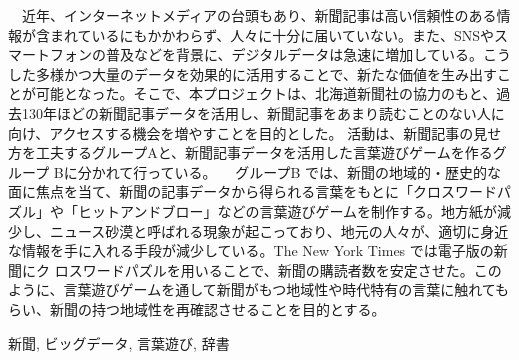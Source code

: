 \documentclass[openany, 11pt,papersize,dvipdfm]{jsbook}
\begin{document}
%
\maketitle

\frontmatter

\begin{jabstract}
　近年、インターネットメディアの台頭もあり、新聞記事は高い信頼性のある情報が含まれているにもかかわらず、人々に十分に届いていない。また、SNSやスマートフォンの普及などを背景に、デジタルデータは急速に増加している。こうした多様かつ大量のデータを効果的に活用することで、新たな価値を生み出すことが可能となった。そこで、本プロジェクトは、北海道新聞社の協力のもと、過去130年ほどの新聞記事データを活用し、新聞記事をあまり読むことのない人に向け、アクセスする機会を増やすことを目的とした。
活動は、新聞記事の見せ方を工夫するグループAと、新聞記事データを活用した言葉遊びゲームを作るグループ Bに分かれて行っている。
　グループB では、新聞の地域的・歴史的な面に焦点を当て、新聞の記事データから得られる言葉をもとに「クロスワードパズル」や「ヒットアンドブロー」などの言葉遊びゲームを制作する。地方紙が減少し、ニュース砂漠と呼ばれる現象が起こっており、地元の人々が、適切に身近な情報を手に入れる手段が減少している。The New York Times では電子版の新聞にク
ロスワードパズルを用いることで、新聞の購読者数を安定させた。このように、言葉遊びゲームを通して新聞がもつ地域性や時代特有の言葉に触れてもらい、新聞の持つ地域性を再確認させることを目的とする。
\begin{jkeyword}
新聞, ビッグデータ, 言葉遊び, 辞書
\end{jkeyword}
\end{jabstract}
\end{document}
